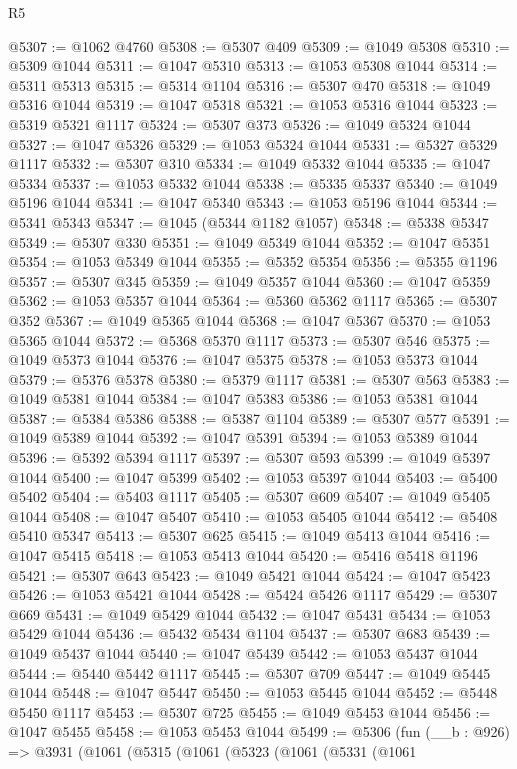 \begin{lexlean}{R5}
\begin{coremodule}
@5307 := @1062 @4760
@5308 := @5307 @409
@5309 := @1049 @5308
@5310 := @5309 @1044
@5311 := @1047 @5310
@5313 := @1053 @5308 @1044
@5314 := @5311 @5313
@5315 := @5314 @1104
@5316 := @5307 @470
@5318 := @1049 @5316 @1044
@5319 := @1047 @5318
@5321 := @1053 @5316 @1044
@5323 := @5319 @5321 @1117
@5324 := @5307 @373
@5326 := @1049 @5324 @1044
@5327 := @1047 @5326
@5329 := @1053 @5324 @1044
@5331 := @5327 @5329 @1117
@5332 := @5307 @310
@5334 := @1049 @5332 @1044
@5335 := @1047 @5334
@5337 := @1053 @5332 @1044
@5338 := @5335 @5337
@5340 := @1049 @5196 @1044
@5341 := @1047 @5340
@5343 := @1053 @5196 @1044
@5344 := @5341 @5343
@5347 := @1045 (@5344 @1182 @1057)
@5348 := @5338 @5347
@5349 := @5307 @330
@5351 := @1049 @5349 @1044
@5352 := @1047 @5351
@5354 := @1053 @5349 @1044
@5355 := @5352 @5354
@5356 := @5355 @1196
@5357 := @5307 @345
@5359 := @1049 @5357 @1044
@5360 := @1047 @5359
@5362 := @1053 @5357 @1044
@5364 := @5360 @5362 @1117
@5365 := @5307 @352
@5367 := @1049 @5365 @1044
@5368 := @1047 @5367
@5370 := @1053 @5365 @1044
@5372 := @5368 @5370 @1117
@5373 := @5307 @546
@5375 := @1049 @5373 @1044
@5376 := @1047 @5375
@5378 := @1053 @5373 @1044
@5379 := @5376 @5378
@5380 := @5379 @1117
@5381 := @5307 @563
@5383 := @1049 @5381 @1044
@5384 := @1047 @5383
@5386 := @1053 @5381 @1044
@5387 := @5384 @5386
@5388 := @5387 @1104
@5389 := @5307 @577
@5391 := @1049 @5389 @1044
@5392 := @1047 @5391
@5394 := @1053 @5389 @1044
@5396 := @5392 @5394 @1117
@5397 := @5307 @593
@5399 := @1049 @5397 @1044
@5400 := @1047 @5399
@5402 := @1053 @5397 @1044
@5403 := @5400 @5402
@5404 := @5403 @1117
@5405 := @5307 @609
@5407 := @1049 @5405 @1044
@5408 := @1047 @5407
@5410 := @1053 @5405 @1044
@5412 := @5408 @5410 @5347
@5413 := @5307 @625
@5415 := @1049 @5413 @1044
@5416 := @1047 @5415
@5418 := @1053 @5413 @1044
@5420 := @5416 @5418 @1196
@5421 := @5307 @643
@5423 := @1049 @5421 @1044
@5424 := @1047 @5423
@5426 := @1053 @5421 @1044
@5428 := @5424 @5426 @1117
@5429 := @5307 @669
@5431 := @1049 @5429 @1044
@5432 := @1047 @5431
@5434 := @1053 @5429 @1044
@5436 := @5432 @5434 @1104
@5437 := @5307 @683
@5439 := @1049 @5437 @1044
@5440 := @1047 @5439
@5442 := @1053 @5437 @1044
@5444 := @5440 @5442 @1117
@5445 := @5307 @709
@5447 := @1049 @5445 @1044
@5448 := @1047 @5447
@5450 := @1053 @5445 @1044
@5452 := @5448 @5450 @1117
@5453 := @5307 @725
@5455 := @1049 @5453 @1044
@5456 := @1047 @5455
@5458 := @1053 @5453 @1044
@5499 := @5306
    (fun (__b : @926) =>
    @3931
      (@1061
        (@5315
          (@1061
            (@5323
              (@1061
                (@5331
                  (@1061

\end{coremodule}
\end{lexlean}
